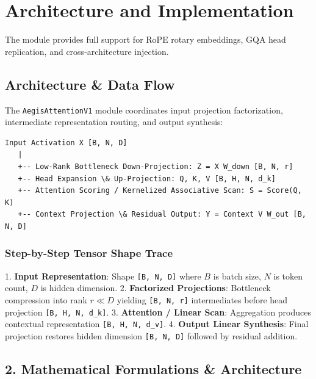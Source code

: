 \section{Architecture and Implementation}The module provides full support for RoPE rotary embeddings, GQA head replication, and cross-architecture injection.



\subsection{Architecture \& Data Flow}
The \texttt{AegisAttentionV1} module coordinates input projection factorization, intermediate representation routing, and output synthesis:

\begin{lstlisting}
Input Activation X [B, N, D]
   |
   +-- Low-Rank Bottleneck Down-Projection: Z = X W_down [B, N, r]
   +-- Head Expansion \& Up-Projection: Q, K, V [B, H, N, d_k]
   +-- Attention Scoring / Kernelized Associative Scan: S = Score(Q, K)
   +-- Context Projection \& Residual Output: Y = Context V W_out [B, N, D]
\end{lstlisting}


\subsubsection{Step-by-Step Tensor Shape Trace}

1. \textbf{Input Representation}: Shape \texttt{[B, N, D]} where $B$ is batch size, $N$ is token count, $D$ is hidden dimension.
2. \textbf{Factorized Projections}: Bottleneck compression into rank $r \ll D$ yielding \texttt{[B, N, r]} intermediates before head projection \texttt{[B, H, N, d\_k]}.
3. \textbf{Attention / Linear Scan}: Aggregation produces contextual representation \texttt{[B, H, N, d\_v]}.
4. \textbf{Output Linear Synthesis}: Final projection restores hidden dimension \texttt{[B, N, D]} followed by residual addition.

\subsection{2. Mathematical Formulations \& Architecture}

